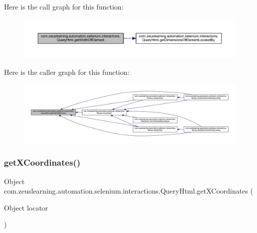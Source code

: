 Here is the call graph for this function\+:
\nopagebreak
\begin{figure}[H]
\begin{center}
\leavevmode
\includegraphics[width=350pt]{dc/d41/classcom_1_1zeuslearning_1_1automation_1_1selenium_1_1interactions_1_1QueryHtml_a8e93f8a477d39f58357ab540e4ef78c1_cgraph}
\end{center}
\end{figure}
Here is the caller graph for this function\+:
\nopagebreak
\begin{figure}[H]
\begin{center}
\leavevmode
\includegraphics[width=350pt]{dc/d41/classcom_1_1zeuslearning_1_1automation_1_1selenium_1_1interactions_1_1QueryHtml_a8e93f8a477d39f58357ab540e4ef78c1_icgraph}
\end{center}
\end{figure}
\hypertarget{classcom_1_1zeuslearning_1_1automation_1_1selenium_1_1interactions_1_1QueryHtml_a093e239edd8567248e9407a4cef24474}{}\label{classcom_1_1zeuslearning_1_1automation_1_1selenium_1_1interactions_1_1QueryHtml_a093e239edd8567248e9407a4cef24474} 
\subsubsection{\texorpdfstring{get\+X\+Coordinates()}{getXCoordinates()}}
{\footnotesize\ttfamily Object com.\+zeuslearning.\+automation.\+selenium.\+interactions.\+Query\+Html.\+get\+X\+Coordinates (\begin{DoxyParamCaption}\item[{Object}]{locator }\end{DoxyParamCaption})\hspace{0.3cm}{\ttfamily [inline]}}

